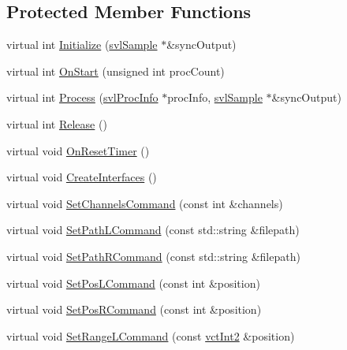 \subsection*{Protected Member Functions}
\begin{DoxyCompactItemize}
\item 
virtual int \hyperlink{classsvl_filter_source_video_file_a1c466c0c0c33d3da0be9a8b010646071}{Initialize} (\hyperlink{classsvl_sample}{svl\+Sample} $\ast$\&sync\+Output)
\item 
virtual int \hyperlink{classsvl_filter_source_video_file_a98a8bd834633d469d5d6348207754ef1}{On\+Start} (unsigned int proc\+Count)
\item 
virtual int \hyperlink{classsvl_filter_source_video_file_a3021fa3689ff9f2e24b3e0b5b79603bb}{Process} (\hyperlink{structsvl_proc_info}{svl\+Proc\+Info} $\ast$proc\+Info, \hyperlink{classsvl_sample}{svl\+Sample} $\ast$\&sync\+Output)
\item 
virtual int \hyperlink{classsvl_filter_source_video_file_ac381ae4ab3182efc839f09643073dfbd}{Release} ()
\item 
virtual void \hyperlink{classsvl_filter_source_video_file_af3ccc486928886bf53c73998f92e9f3d}{On\+Reset\+Timer} ()
\item 
virtual void \hyperlink{classsvl_filter_source_video_file_a8ffbc78ebf75dc6884006a882e0d9435}{Create\+Interfaces} ()
\item 
virtual void \hyperlink{classsvl_filter_source_video_file_acbaf9def1d52fe176fb653ed7b6dcd0a}{Set\+Channels\+Command} (const int \&channels)
\item 
virtual void \hyperlink{classsvl_filter_source_video_file_a50e0354818f074377550012423d0469b}{Set\+Path\+L\+Command} (const std\+::string \&filepath)
\item 
virtual void \hyperlink{classsvl_filter_source_video_file_a04b7c8fe4be551aa5251ec8b3d89b770}{Set\+Path\+R\+Command} (const std\+::string \&filepath)
\item 
virtual void \hyperlink{classsvl_filter_source_video_file_af286cefc39044c34ba7fa8e4d7d715d5}{Set\+Pos\+L\+Command} (const int \&position)
\item 
virtual void \hyperlink{classsvl_filter_source_video_file_a3da09c90192a5b7b2accfd9725b3d4b9}{Set\+Pos\+R\+Command} (const int \&position)
\item 
virtual void \hyperlink{classsvl_filter_source_video_file_a397f5b16433461639fa77059cb4b2bd7}{Set\+Range\+L\+Command} (const \hyperlink{vct_fixed_size_vector_types_8h_add8c88eb6a432b15f14b866b9c35325f}{vct\+Int2} \&position)

\end{DoxyCompactItemize}
